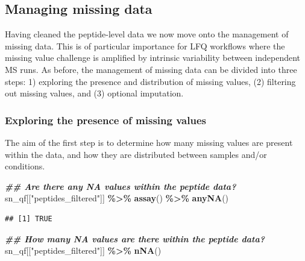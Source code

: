 \documentclass[9pt,a4paper,]{extarticle}
\newenvironment{Shaded}{\begin{snugshade}}{\end{snugshade}}
\newcommand{\DocumentationTok}[1]{\textcolor[rgb]{0.56,0.35,0.01}{\textbf{\textit{#1}}}}
\newcommand{\FunctionTok}[1]{\textcolor[rgb]{0.13,0.29,0.53}{\textbf{#1}}}
\newcommand{\NormalTok}[1]{#1}
\newcommand{\SpecialCharTok}[1]{\textcolor[rgb]{0.81,0.36,0.00}{\textbf{#1}}}
\newcommand{\StringTok}[1]{\textcolor[rgb]{0.31,0.60,0.02}{#1}}
\begin{document}
\subsection{Managing missing data}\label{managing-missing-data-1}

Having cleaned the peptide-level data we now move onto the management of missing
data. This is of particular importance for LFQ workflows where the missing value
challenge is amplified by intrinsic variability between independent MS runs. As
before, the management of missing data can be divided into three steps: 1)
exploring the presence and distribution of missing values, (2) filtering out
missing values, and (3) optional imputation.

\subsubsection{Exploring the presence of missing values}\label{exploring-the-presence-of-missing-values-1}

The aim of the first step is to determine how many missing values are present
within the data, and how they are distributed between samples and/or conditions.

\begin{Shaded}
\begin{Highlighting}[]
\DocumentationTok{\#\# Are there any NA values within the peptide data?}
\NormalTok{sn\_qf[[}\StringTok{"peptides\_filtered"}\NormalTok{]] }\SpecialCharTok{\%\textgreater{}\%}
  \FunctionTok{assay}\NormalTok{() }\SpecialCharTok{\%\textgreater{}\%}
  \FunctionTok{anyNA}\NormalTok{()}
\end{Highlighting}
\end{Shaded}

\begin{verbatim}
## [1] TRUE
\end{verbatim}

\begin{Shaded}
\begin{Highlighting}[]
\DocumentationTok{\#\# How many NA values are there within the peptide data?}
\NormalTok{sn\_qf[[}\StringTok{"peptides\_filtered"}\NormalTok{]] }\SpecialCharTok{\%\textgreater{}\%}
  \FunctionTok{nNA}\NormalTok{()}
\end{Highlighting}
\end{Shaded}
\end{document}
